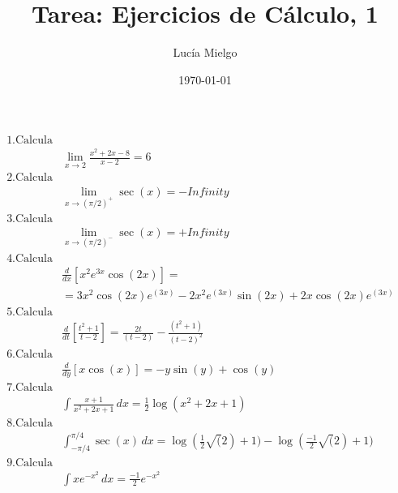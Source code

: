 \documentclass{article}
\title{Tarea: Ejercicios de Cálculo, 1}
\author{Lucía Mielgo}
\date{\today}
\begin{document}
\maketitle
\begin{align*}
\text{1.Calcula}\\
&\lim_{x \to 2}\frac{x^2+2x-8}{x-2}=6\\
\text{2.Calcula}\\
&\lim_{x \to {(\pi/2)}^+}\sec(x)=-Infinity\\
\text{3.Calcula}\\
&\lim_{x \to {(\pi/2)}^-}\sec(x)=+Infinity\\
\text{4.Calcula}\\
&\frac{d }{d x}[x^2e^{3x}\cos(2x)]=&\\
&=3x^2\cos(2x)e^(3x) - 2x^2e^(3x)\sin(2x) + 2x\cos(2x)e^(3x)\\
\text{5.Calcula}\\
&\frac{d }{d t}[\frac{t^2+1}{t-2}]=\frac{2t}{(t - 2)}-\frac{(t^2 + 1)}{{(t-2)}^2} \\
\text{6.Calcula}\\
&\frac{d }{d y}[x\cos(x)]=-y\sin(y) + \cos(y)\\
\text{7.Calcula}\\
&\int \frac{x+1}{x^2+2x+1}\,dx=\frac{1}{2}\log(x^2 + 2x + 1)\\
\text{8.Calcula}\\
&\int_{-\pi /4}^{\pi/4} \sec(x) \,dx=\log(\frac{1}{2}\sqrt(2) + 1) - \log(\frac{-1}{2}\sqrt(2) + 1) \\
\text{9.Calcula}\\
&\int xe^{-x^{2}}\,dx=\frac{-1}{2}e^{-x^2}
\end{align*}
\end{document}
